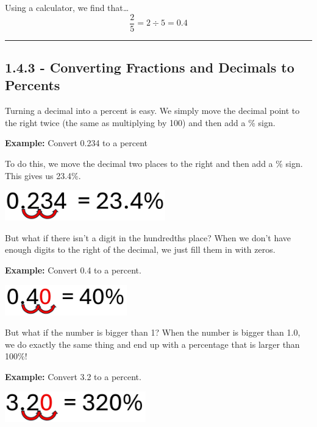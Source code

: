 \documentclass[
  letterpaper,
  DIV=11,
  numbers=noendperiod]{scrreprt}
\begin{document}
Using a calculator, we find that\ldots{} \[
\frac{2}{5} = 2 \div 5 = 0.4
\]

\begin{center}\rule{0.5\linewidth}{0.5pt}\end{center}

\subsection*{1.4.3 - Converting Fractions and Decimals to
Percents}\label{converting-fractions-and-decimals-to-percents}

Turning a decimal into a percent is easy. We simply move the decimal
point to the right twice (the same as multiplying by 100) and then add a
\% sign.

\textbf{Example:} Convert 0.234 to a percent

To do this, we move the decimal two places to the right and then add a
\% sign. This gives us 23.4\%.

\includegraphics[width=\linewidth,height=0.52083in,keepaspectratio]{images/Unit_1/Lesson_4/convert_point_234.png}

But what if there isn't a digit in the hundredths place? When we don't
have enough digits to the right of the decimal, we just fill them in
with zeros.

\textbf{Example:} Convert 0.4 to a percent.

\includegraphics[width=\linewidth,height=0.52083in,keepaspectratio]{images/Unit_1/Lesson_4/convert_point_4.png}

But what if the number is bigger than 1? When the number is bigger than
1.0, we do exactly the same thing and end up with a percentage that is
larger than 100\%!

\textbf{Example:} Convert 3.2 to a percent.

\includegraphics[width=\linewidth,height=0.52083in,keepaspectratio]{images/Unit_1/Lesson_4/convert_3_point_2.png}
\end{document}
